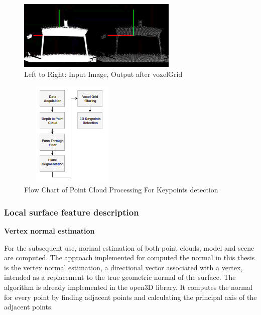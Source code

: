 \begin{figure}[!h]
\begin{center}
\includegraphics[width=3in]{figures03/voxelcloud1.png}
\caption{Left to Right: Input Image, Output after voxelGrid}%
\label{fig:voxeldown}
\end{center}
\end{figure}

\begin{figure}[!h]
\begin{center}
\includegraphics[width=2in,height=2in]{diagrams/keypoints.png}
\caption{Flow Chart of Point Cloud Processing For Keypoints detection}
\label{fig:planesegmentation}
\end{center}
\end{figure}

\subsubsection{Local surface feature description}
\textbf{Vertex normal estimation}

For the subsequent use, normal estimation of both point clouds, model and scene are computed. The approach implemented for computed the normal in this thesis is the vertex normal estimation, a directional vector associated with a vertex, intended as a replacement to the true geometric normal of the surface. The algorithm is already implemented in the open3D \cite{open3d} library. 
It computes the normal for every point by finding adjacent points and calculating the principal axis of the adjacent points.

